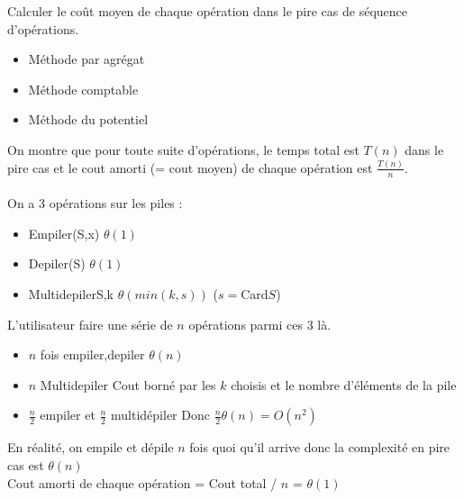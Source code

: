  Calculer le coût moyen de chaque opération dans le pire cas de séquence d'opérations. \\

\begin{itemize}
	\item Méthode par agrégat
	\item Méthode comptable
	\item Méthode du potentiel
\end{itemize}

 On montre que pour toute suite d'opérations, le temps total est $T(n)$ dans le pire cas et le cout amorti (= cout moyen) de chaque opération est $\frac{T(n)}{n}$. \\

 \\
On a 3 opérations sur les piles :
\begin{itemize}
	\item Empiler(S,x) $\theta(1)$
	\item Depiler(S) $\theta(1)$
	\item Multidepiler{S,k} $\theta(min(k,s))$ ($s=$Card$S$)
\end{itemize}
L'utilisateur faire une série de $n$ opérations parmi ces 3 là.
\begin{itemize}
	\item $n$ fois empiler,depiler $\theta(n)$
	\item $n$ Multidepiler Cout borné par les $k$ choisis et le nombre d'éléments de la pile
	\item $\frac{n}{2}$ empiler et $\frac{n}{2}$ multidépiler Donc $\frac{n}{2}\theta(n) = O(n^2)$
\end{itemize}
En réalité, on empile et dépile $n$ fois quoi qu'il arrive donc la complexité en pire cas est $\theta(n)$\\
Cout amorti de chaque opération = Cout total / $n$ = $\theta(1)$

